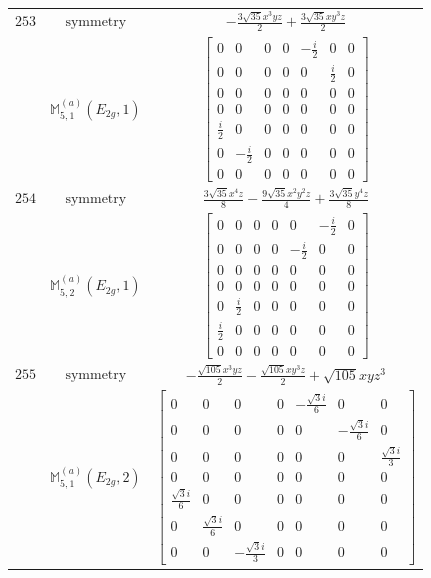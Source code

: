 \documentclass[fleqn,8pt,landscape]{jsarticle}
\begin{document}
\begin{longtable}{ccc}
$ 253 $ & $ \text{symmetry} $ & $ - \frac{3 \sqrt{35} x^{3} y z}{2} + \frac{3 \sqrt{35} x y^{3} z}{2} $ \\
$  $ & $ \mathbb{M}_{5,1}^{(a)}(E_{2g},1) $ & $ \begin{bmatrix} 0 & 0 & 0 & 0 & - \frac{i}{2} & 0 & 0 \\ 0 & 0 & 0 & 0 & 0 & \frac{i}{2} & 0 \\ 0 & 0 & 0 & 0 & 0 & 0 & 0 \\ 0 & 0 & 0 & 0 & 0 & 0 & 0 \\ \frac{i}{2} & 0 & 0 & 0 & 0 & 0 & 0 \\ 0 & - \frac{i}{2} & 0 & 0 & 0 & 0 & 0 \\ 0 & 0 & 0 & 0 & 0 & 0 & 0 \end{bmatrix} $ \\ \hline
$ 254 $ & $ \text{symmetry} $ & $ \frac{3 \sqrt{35} x^{4} z}{8} - \frac{9 \sqrt{35} x^{2} y^{2} z}{4} + \frac{3 \sqrt{35} y^{4} z}{8} $ \\
$  $ & $ \mathbb{M}_{5,2}^{(a)}(E_{2g},1) $ & $ \begin{bmatrix} 0 & 0 & 0 & 0 & 0 & - \frac{i}{2} & 0 \\ 0 & 0 & 0 & 0 & - \frac{i}{2} & 0 & 0 \\ 0 & 0 & 0 & 0 & 0 & 0 & 0 \\ 0 & 0 & 0 & 0 & 0 & 0 & 0 \\ 0 & \frac{i}{2} & 0 & 0 & 0 & 0 & 0 \\ \frac{i}{2} & 0 & 0 & 0 & 0 & 0 & 0 \\ 0 & 0 & 0 & 0 & 0 & 0 & 0 \end{bmatrix} $ \\ \hline
$ 255 $ & $ \text{symmetry} $ & $ - \frac{\sqrt{105} x^{3} y z}{2} - \frac{\sqrt{105} x y^{3} z}{2} + \sqrt{105} x y z^{3} $ \\
$  $ & $ \mathbb{M}_{5,1}^{(a)}(E_{2g},2) $ & $ \begin{bmatrix} 0 & 0 & 0 & 0 & - \frac{\sqrt{3} i}{6} & 0 & 0 \\ 0 & 0 & 0 & 0 & 0 & - \frac{\sqrt{3} i}{6} & 0 \\ 0 & 0 & 0 & 0 & 0 & 0 & \frac{\sqrt{3} i}{3} \\ 0 & 0 & 0 & 0 & 0 & 0 & 0 \\ \frac{\sqrt{3} i}{6} & 0 & 0 & 0 & 0 & 0 & 0 \\ 0 & \frac{\sqrt{3} i}{6} & 0 & 0 & 0 & 0 & 0 \\ 0 & 0 & - \frac{\sqrt{3} i}{3} & 0 & 0 & 0 & 0 \end{bmatrix} $ \\ \hline

\end{longtable}
\end{document}
